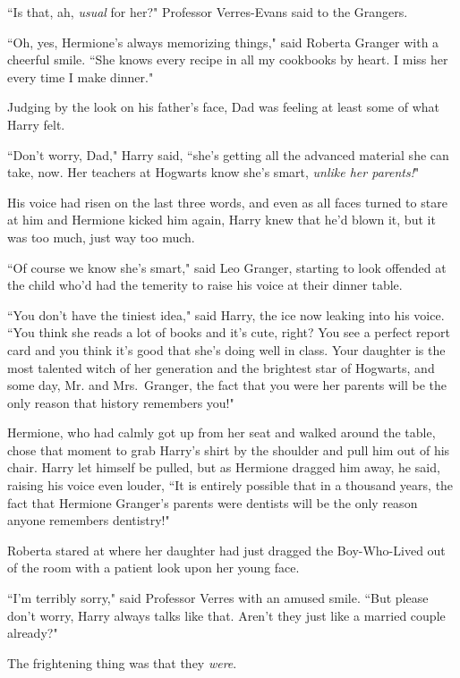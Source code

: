 ``Is that, ah, \emph{usual} for her?" Professor Verres-Evans said to the Grangers.

``Oh, yes, Hermione's always memorizing things," said Roberta Granger with a cheerful smile. ``She knows every recipe in all my cookbooks by heart. I miss her every time I make dinner."

Judging by the look on his father's face, Dad was feeling at least some of what Harry felt.

``Don't worry, Dad," Harry said, ``she's getting all the advanced material she can take, now. Her teachers at Hogwarts know she's smart, \emph{unlike her parents!}"

His voice had risen on the last three words, and even as all faces turned to stare at him and Hermione kicked him again, Harry knew that he'd blown it, but it was too much, just way too much.

``Of course we know she's smart," said Leo Granger, starting to look offended at the child who'd had the temerity to raise his voice at their dinner table.

``You don't have the tiniest idea," said Harry, the ice now leaking into his voice. ``You think she reads a lot of books and it's cute, right? You see a perfect report card and you think it's good that she's doing well in class. Your daughter is the most talented witch of her generation and the brightest star of Hogwarts, and some day, Mr. and Mrs.~Granger, the fact that you were her parents will be the only reason that history remembers you!"

Hermione, who had calmly got up from her seat and walked around the table, chose that moment to grab Harry's shirt by the shoulder and pull him out of his chair. Harry let himself be pulled, but as Hermione dragged him away, he said, raising his voice even louder, ``It is entirely possible that in a thousand years, the fact that Hermione Granger's parents were dentists will be the only reason anyone remembers dentistry!"

\later

Roberta stared at where her daughter had just dragged the Boy-Who-Lived out of the room with a patient look upon her young face.

``I'm terribly sorry," said Professor Verres with an amused smile. ``But please don't worry, Harry always talks like that. Aren't they just like a married couple already?"

The frightening thing was that they \emph{were}.

\later

